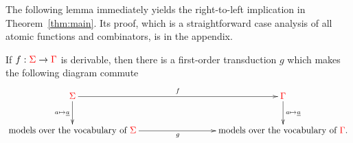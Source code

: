 The following lemma immediately yields the right-to-left implication in Theorem~\ref{thm:main}. Its proof, which is a straightforward case analysis of all atomic functions and combinators, is in the appendix. 


  
\begin{proposition}\label{prop:to-logic} If $f : {\color{red}{\Sigma}} \to {\color{red}{\Gamma}}$ is derivable, then there is a first-order transduction $g$ 
    which makes the following diagram commute
    \begin{align*}
        \xymatrix@C=3cm{
            \rSigma \ar[d]_{a \mapsto \underline a}\ar[r]^f &  \rGamma \ar[d]^{a \mapsto \underline a} \\
            \text{models over the vocabulary of  $ \rSigma$} \ar[r]_g &  \text{models over the vocabulary of  $ \rGamma$}.
        } 
    \end{align*}
    
\end{proposition}



